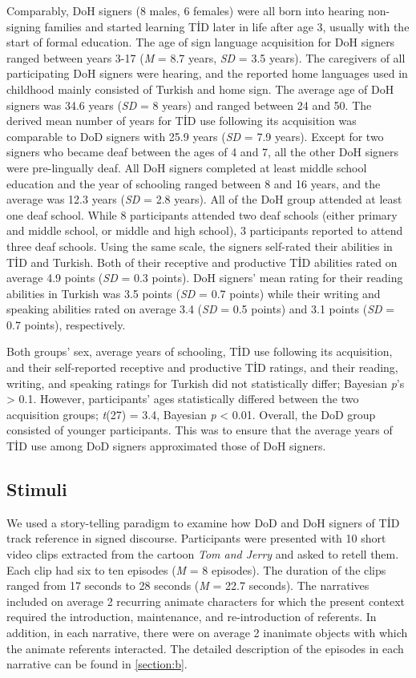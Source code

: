 \documentclass[review]{elsarticle} %
\begin{document}
Comparably, DoH signers (8 males, 6 females) were all born into hearing
non-signing families and started learning TİD later in life after age 3,
usually with the start of formal education. The age of sign language
acquisition for DoH signers ranged between years 3-17 (\emph{M} = 8.7
years, \emph{SD} = 3.5 years). The caregivers of all participating DoH
signers were hearing, and the reported home languages used in childhood
mainly consisted of Turkish and home sign. The average age of DoH
signers was 34.6 years (\emph{SD} = 8 years) and ranged between 24 and
50. The derived mean number of years for TİD use following its
acquisition was comparable to DoD signers with 25.9 years (\emph{SD} =
7.9 years). Except for two signers who became deaf between the ages of 4
and 7, all the other DoH signers were pre-lingually deaf. All DoH
signers completed at least middle school education and the year of
schooling ranged between 8 and 16 years, and the average was 12.3 years
(\emph{SD} = 2.8 years). All of the DoH group attended at least one deaf
school. While 8 participants attended two deaf schools (either primary
and middle school, or middle and high school), 3 participants reported
to attend three deaf schools. Using the same scale, the signers
self-rated their abilities in TİD and Turkish. Both of their receptive
and productive TİD abilities rated on average 4.9 points (\emph{SD} =
0.3 points). DoH signers' mean rating for their reading abilities in
Turkish was 3.5 points (\emph{SD} = 0.7 points) while their writing and
speaking abilities rated on average 3.4 (\emph{SD} = 0.5 points) and 3.1
points (\emph{SD} = 0.7 points), respectively.

Both groups' sex, average years of schooling, TİD use following its
acquisition, and their self-reported receptive and productive TİD
ratings, and their reading, writing, and speaking ratings for Turkish
did not statistically differ; Bayesian \emph{p}'s \textgreater{} 0.1.
However, participants' ages statistically differed between the two
acquisition groups; \emph{t}(27) = 3.4, Bayesian \emph{p} \textless{}
0.01. Overall, the DoD group consisted of younger participants. This was
to ensure that the average years of TİD use among DoD signers
approximated those of DoH signers.

\hypertarget{stimuli}{%
\subsection{Stimuli}\label{stimuli}}

We used a story-telling paradigm to examine how DoD and DoH signers of
TİD track reference in signed discourse. Participants were presented
with 10 short video clips extracted from the cartoon \emph{Tom and
Jerry} and asked to retell them. Each clip had six to ten episodes
(\emph{M} = 8 episodes). The duration of the clips ranged from 17
seconds to 28 seconds (\emph{M} = 22.7 seconds). The narratives included
on average 2 recurring animate characters for which the present context
required the introduction, maintenance, and re-introduction of
referents. In addition, in each narrative, there were on average 2
inanimate objects with which the animate referents interacted. The
detailed description of the episodes in each narrative can be found in
\ref{section:b}.
\end{document}
